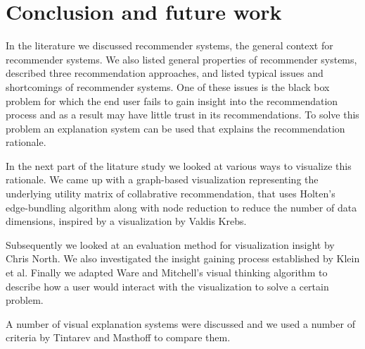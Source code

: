 \chapter{Conclusion and future work}\label{chapter:conclusion}


In the literature we discussed recommender systems, the general context for recommender systems. We also listed general properties of recommender systems, described three recommendation approaches, and listed typical issues and shortcomings of recommender systems. One of these issues is the black box problem for which the end user fails to gain insight into the recommendation process and as a result may have little trust in its recommendations. To solve this problem an explanation system can be used that explains the recommendation rationale.

In the next part of the litature study we looked at various ways to visualize this rationale. We came up with a graph-based visualization representing the underlying utility matrix of collabrative recommendation, that uses Holten's edge-bundling algorithm along with node reduction to reduce the number of data dimensions, inspired by a visualization by Valdis Krebs.

Subsequently we looked at an evaluation method for visualization insight by Chris North. We also investigated the insight gaining process established by Klein et al. Finally we adapted Ware and Mitchell's visual thinking algorithm to describe how a user would interact with the visualization to solve a certain problem.

A number of visual explanation systems were discussed and we used a number of criteria by Tintarev and Masthoff to compare them.

